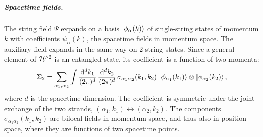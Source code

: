 \subparagraph{Spacetime fields.}

The string field $\Psi$ expands on a basis $\ket{\phi_\alpha(k)}$ of single-string states of momentum $k$ with coefficients $\psi_\alpha(k)$, the spacetime fields in momentum space.
The auxiliary field expands in the same way on $2$-string states.
Since a general element of $\mathcal{H}^{\wedge 2}$ is an entangled state, its coefficient is a function of two momenta:
\begin{equation}
  \label{p:eq:hs4:spacetime}
  \Sigma_2
    = \sum_{\alpha_1, \alpha_2} \int \frac{\mathrm{d}^d k_1}{(2\pi)^d} \, \frac{\mathrm{d}^d k_2}{(2\pi)^d} \,
      \sigma_{\alpha_1 \alpha_2}(k_1, k_2) \,
      \ket{\phi_{\alpha_1}(k_1)} \otimes \ket{\phi_{\alpha_2}(k_2)},
\end{equation}
where $d$ is the spacetime dimension.
The coefficient is symmetric under the joint exchange of the two strands, $(\alpha_1, k_1) \leftrightarrow (\alpha_2, k_2)$.
The components $\sigma_{\alpha_1 \alpha_2}(k_1, k_2)$ are bilocal fields in momentum space, and thus also in position space, where they are functions of two spacetime points.

